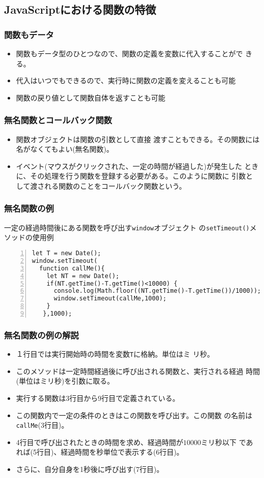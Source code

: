 \subsection{JavaScriptにおける関数の特徴}
\begin{frame}[containsverbatim]
\frametitle{関数もデータ}
\begin{itemize}
 \item 関数もデータ型のひとつなので、関数の定義を変数に代入することがで
       きる。
 \item 代入はいつでもできるので、実行時に関数の定義を変えることも可能
 \item 関数の戻り値として関数自体を返すことも可能
\end{itemize}
\end{frame}
\begin{frame}[containsverbatim]
\frametitle{無名関数とコールバック関数}
\begin{itemize}
 \item 関数オブジェクトは関数の引数として直接
渡すこともできる。その関数には名がなくてもよい(無名関数)。
 \item イベント(マウスがクリックされた、一定の時間が経過した)が発生した
       ときに、その処理を行う関数を登録する必要がある。このように関数に
       引数として渡される関数のことをコールバック関数という。
\end{itemize}
\end{frame}
\begin{frame}[containsverbatim]
\frametitle{無名関数の例}
一定の経過時間後にある関数を呼び出す\Verb+window+オブジェクト
 の\Verb+setTimeout()+メソッドの使用例

 \hspace*{1zw}\begin{minipage}[t]{0.9\textwidth}
\begin{Verbatim}[numbers=left]
let T = new Date();
window.setTimeout(
  function callMe(){
    let NT = new Date();
    if(NT.getTime()-T.getTime()<10000) {
      console.log(Math.floor((NT.getTime()-T.getTime())/1000));
      window.setTimeout(callMe,1000);
    }
   },1000);
\end{Verbatim}
\end{minipage}
\end{frame}
\begin{frame}[containsverbatim]
\frametitle{無名関数の例の解説}
\begin{itemize}
 \item １行目では実行開始時の時間を変数\Verb+T+に格納。単位はミ
       リ秒。
 \item このメソッドは一定時間経過後に呼び出される関数と、実行される経過
       時間(単位はミリ秒)を引数に取る。
 \item 実行する関数は3行目から9行目で定義されている。
 \item この関数内で一定の条件のときはこの関数を呼び出す。この関数
       の名前は\Verb+callMe+(3行目)。
 \item 4行目で呼び出されたときの時間を求め、経過時間が$10000$ミリ秒以下
       であれば(5行目)、経過時間を秒単位で表示する(6行目)。
 \item さらに、自分自身を1秒後に呼び出す(7行目)。
\end{itemize}
\end{frame}
